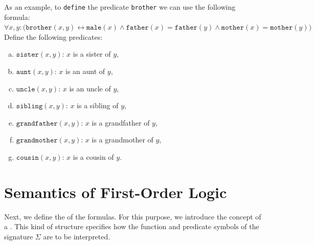 As an example, to \texttt{define} the predicate \texttt{brother} we can use the following formula:
\\[0.2cm]
\hspace*{1.3cm}
$\forall x, y:\bigl(\mathtt{brother}(x, y) \leftrightarrow \mathtt{male}(x) \wedge \mathtt{father}(x)
= \mathtt{father}(y) \wedge \mathtt{mother}(x) = \mathtt{mother}(y)\bigr)$
\\[0.2cm]
Define the following predicates:
\begin{enumerate}[(a)]
\item $\texttt{sister}(x, y)$: $x$ is a sister of $y$,
\item $\texttt{aunt}(x, y)$: $x$ is an aunt of $y$,
\item $\mathtt{uncle}(x, y)$:  $x$ is an uncle of $y$,
\item $\texttt{sibling}(x, y)$: $x$ is a sibling of $y$, 
\item $\texttt{grandfather}(x, y)$: $x$ is a grandfather of $y$,
\item $\texttt{grandmother}(x, y)$: $x$ is a grandmother of $y$,
\item $\texttt{cousin}(x, y)$: $x$ is a cousin of $y$.
  \eox
\end{enumerate}


\section{Semantics of First-Order Logic \label{sec:semantik}}
Next, we define the  of the formulas. For this purpose, we introduce the concept of a
.  This kind of structure specifies how the
function and predicate symbols of the signature $\Sigma$ are to be interpreted.

